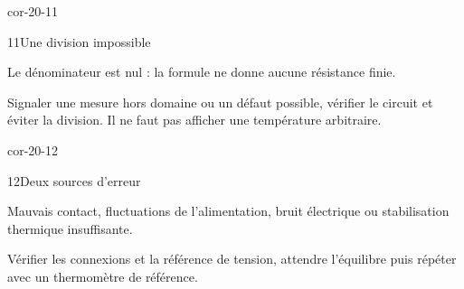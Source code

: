 \begin{blocLivre}{cor-20-11}\begin{corrige}{11}{Une division impossible}
\begin{questions}
\item Le dénominateur est nul : la formule ne donne aucune résistance finie.
\item Signaler une mesure hors domaine ou un défaut possible, vérifier le circuit et éviter la division. Il ne faut pas afficher une température arbitraire.
\end{questions}
\end{corrige}\end{blocLivre}
\begin{blocLivre}{cor-20-12}\begin{corrige}{12}{Deux sources d’erreur}
\begin{questions}
\item Mauvais contact, fluctuations de l’alimentation, bruit électrique ou stabilisation thermique insuffisante.
\item Vérifier les connexions et la référence de tension, attendre l’équilibre puis répéter avec un thermomètre de référence.
\end{questions}
\end{corrige}\end{blocLivre}

